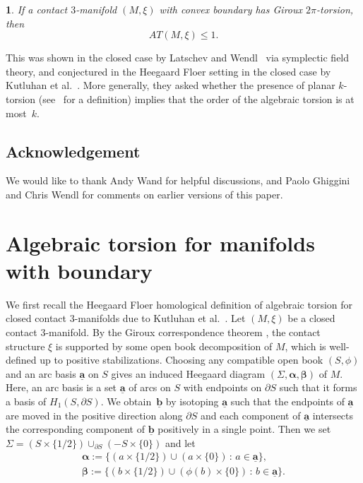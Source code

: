 \documentclass[11pt,oneside,english]{amsart}
\numberwithin{equation}{section}
\numberwithin{figure}{section}
\theoremstyle{definition}
\theoremstyle{plain}
\newtheorem{thm}{\protect\theoremname}
\theoremstyle{plain}
\theoremstyle{remark}
\theoremstyle{plain}
\providecommand{\theoremname}{Theorem}
\begin{document}
\begin{thm} \label{thm:gt}
If a contact $3$-manifold $(M,\xi)$ with convex boundary has Giroux $2\pi$-torsion,
then
\[
{\mathit{AT}}(M,\xi) \le 1.
\]
\end{thm}

This was shown in the closed case by Latschev and Wendl~\cite[Theorem~2]{key-11}
via symplectic field theory, and conjectured in the Heegaard Floer setting
in the closed case by Kutluhan et al.~\cite[Question~3.2]{key-10}.
More generally, they asked whether the presence of planar $k$-torsion (see~\cite[Section~3.1]{key-11}
for a definition) implies that the order of the algebraic torsion is at most~$k$.

\subsection*{Acknowledgement} We would like to thank Andy Wand for helpful discussions,
and Paolo Ghiggini and Chris Wendl for comments on earlier versions of this paper.

\section{Algebraic torsion for manifolds with boundary}

We first recall the Heegaard Floer homological definition of algebraic torsion for closed contact
$3$-manifolds due to Kutluhan et al.~\cite{key-10}. Let $(M,\xi)$ be a closed contact 3-manifold.
By the Giroux correspondence theorem \cite{key-9}, the contact structure $\xi$ is supported by
some open book decomposition of $M$, which is well-defined up to positive stabilizations.
Choosing any compatible open book $(S,\phi)$ and an arc basis $\underline{\mathbf{a}}$
on $S$ gives an induced Heegaard diagram $(\Sigma,{\boldsymbol{\alpha}},{\boldsymbol{\beta}})$
of $M$. Here, an arc basis is a set ${\underline{\mathbf{a}}}$ of
arcs on $S$ with endpoints on $\partial S$ such that it forms a basis of $H_1(S,\partial S)$.
We obtain~${\underline{\mathbf{b}}}$ by isotoping ${\underline{\mathbf{a}}}$ such that the endpoints of ${\underline{\mathbf{a}}}$ are moved in the positive
direction along $\partial S$ and each component of ${\underline{\mathbf{a}}}$ intersects the corresponding component
of ${\underline{\mathbf{b}}}$ positively in a single point.
Then we set $\Sigma = (S \times \{1/2\}) \cup_{\partial S} (-S \times \{0\})$ and let
\[
\begin{split}
{\boldsymbol{\alpha}} := \{(a \times \{1/2\}) \cup (a \times \{0\}) \,\colon\, a \in \underline{\mathbf{a}}\}, \\
{\boldsymbol{\beta}} := \{(b \times \{1/2\}) \cup (\phi(b) \times \{0\}) \,\colon\, b \in \underline{\mathbf{a}}\}.
\end{split}
\]
\end{document}
